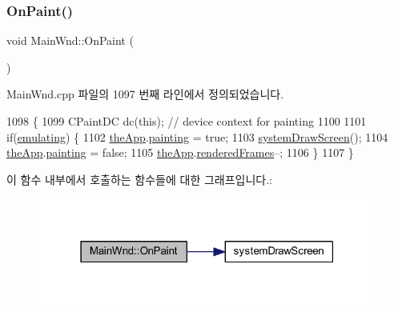 \subsubsection{\texorpdfstring{On\+Paint()}{OnPaint()}}
{\footnotesize\ttfamily void Main\+Wnd\+::\+On\+Paint (\begin{DoxyParamCaption}{ }\end{DoxyParamCaption})\hspace{0.3cm}{\ttfamily [protected]}}



Main\+Wnd.\+cpp 파일의 1097 번째 라인에서 정의되었습니다.


\begin{DoxyCode}
1098 \{
1099   CPaintDC dc(\textcolor{keyword}{this}); \textcolor{comment}{// device context for painting}
1100   
1101   \textcolor{keywordflow}{if}(\mbox{\hyperlink{gb_globals_8h_af9cc36078b1b311753963297ae7f2a74}{emulating}}) \{
1102     \mbox{\hyperlink{_v_b_a_8cpp_a8095a9d06b37a7efe3723f3218ad8fb3}{theApp}}.\mbox{\hyperlink{class_v_b_a_acf5db3724f3961d0c7b7a48b1682ab09}{painting}} = \textcolor{keyword}{true};
1103     \mbox{\hyperlink{system_8cpp_a14942622916d869491ac62211b9db1b6}{systemDrawScreen}}();
1104     \mbox{\hyperlink{_v_b_a_8cpp_a8095a9d06b37a7efe3723f3218ad8fb3}{theApp}}.\mbox{\hyperlink{class_v_b_a_acf5db3724f3961d0c7b7a48b1682ab09}{painting}} = \textcolor{keyword}{false};
1105     \mbox{\hyperlink{_v_b_a_8cpp_a8095a9d06b37a7efe3723f3218ad8fb3}{theApp}}.\mbox{\hyperlink{class_v_b_a_a05df4a540441a0a8862376af6a2fc57b}{renderedFrames}}--;
1106   \}
1107 \}
\end{DoxyCode}
이 함수 내부에서 호출하는 함수들에 대한 그래프입니다.\+:
\nopagebreak
\begin{figure}[H]
\begin{center}
\leavevmode
\includegraphics[width=316pt]{class_main_wnd_a0c100c54d2e6d48fa3f68d2da1609e65_cgraph}
\end{center}
\end{figure}
\mbox{\label{class_main_wnd_a8aae2e29b1e1426dbfce42deade38485}} 
